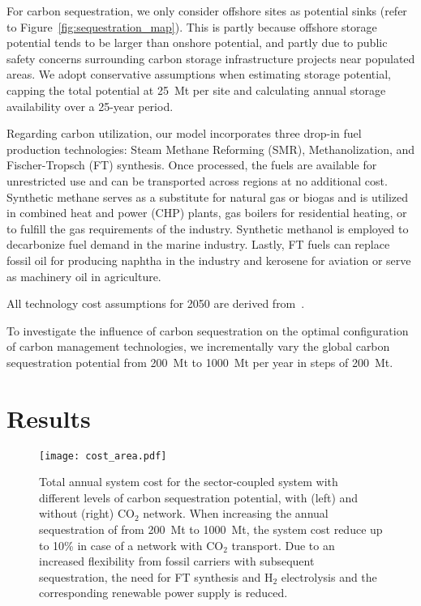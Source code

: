 \documentclass[conference]{IEEEtran}
\begin{document}
For carbon sequestration, we only consider offshore sites as potential sinks (refer to Figure~\ref{fig:sequestration_map}). This is partly because offshore storage potential tends to be larger than onshore potential, and partly due to public safety concerns surrounding carbon storage infrastructure projects near populated areas. We adopt conservative assumptions when estimating storage potential, capping the total potential at 25~Mt per site and calculating annual storage availability over a 25-year period.

Regarding carbon utilization, our model incorporates three drop-in fuel production technologies: Steam Methane Reforming (SMR), Methanolization, and Fischer-Tropsch (FT) synthesis. Once processed, the fuels are available for unrestricted use and can be transported across regions at no additional cost. Synthetic methane serves as a substitute for natural gas or biogas and is utilized in combined heat and power (CHP) plants, gas boilers for residential heating, or to fulfill the gas requirements of the industry. Synthetic methanol is employed to decarbonize fuel demand in the marine industry. Lastly, FT fuels can replace fossil oil for producing naphtha in the industry and kerosene for aviation or serve as machinery oil in agriculture.

All technology cost assumptions for 2050 are derived from~\cite{lisazeyenPyPSATechnologydataTechnology2023}.

To investigate the influence of carbon sequestration on the optimal configuration of carbon management technologies, we incrementally vary the global carbon sequestration potential from 200~Mt to 1000~Mt per year in steps of 200~Mt.

\section{Results}
\label{sec:results}

\begin{figure*}[h!]
    \centering
    \texttt{[image: cost\_area.pdf]}
    \caption[short]{Total annual system cost for the sector-coupled system with different levels of carbon sequestration potential, with (left) and without (right) CO$_2$ network. When increasing the annual sequestration of from 200~Mt to 1000~Mt, the system cost reduce up to 10\% in case of a network with CO$_2$ transport. Due to an increased flexibility from fossil carriers with subsequent sequestration, the need for FT synthesis and H$_2$ electrolysis and the corresponding renewable power supply is reduced. }
    \label{fig:cost_area}
\end{figure*}
\end{document}
